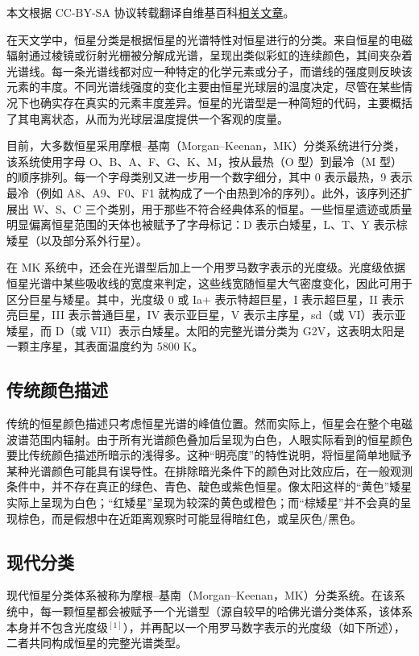 
本文根据 CC-BY-SA 协议转载翻译自维基百科\href{https://en.wikipedia.org/wiki/Stellar_classification}{相关文章}。

在天文学中，恒星分类是根据恒星的光谱特性对恒星进行的分类。来自恒星的电磁辐射通过棱镜或衍射光栅被分解成光谱，呈现出类似彩虹的连续颜色，其间夹杂着光谱线。每一条光谱线都对应一种特定的化学元素或分子，而谱线的强度则反映该元素的丰度。不同光谱线强度的变化主要由恒星光球层的温度决定，尽管在某些情况下也确实存在真实的元素丰度差异。恒星的光谱型是一种简短的代码，主要概括了其电离状态，从而为光球层温度提供一个客观的度量。

目前，大多数恒星采用摩根–基南（Morgan–Keenan，MK）分类系统进行分类，该系统使用字母 O、B、A、F、G、K、M，按从最热（O 型）到最冷（M 型）的顺序排列。每一个字母类别又进一步用一个数字细分，其中 0 表示最热，9 表示最冷（例如 A8、A9、F0、F1 就构成了一个由热到冷的序列）。此外，该序列还扩展出 W、S、C 三个类别，用于那些不符合经典体系的恒星。一些恒星遗迹或质量明显偏离恒星范围的天体也被赋予了字母标记：D 表示白矮星，L、T、Y 表示棕矮星（以及部分系外行星）。

在 MK 系统中，还会在光谱型后加上一个用罗马数字表示的光度级。光度级依据恒星光谱中某些吸收线的宽度来判定，这些线宽随恒星大气密度变化，因此可用于区分巨星与矮星。其中，光度级 0 或 Ia+ 表示特超巨星，I 表示超巨星，II 表示亮巨星，III 表示普通巨星，IV 表示亚巨星，V 表示主序星，sd（或 VI）表示亚矮星，而 D（或 VII）表示白矮星。太阳的完整光谱分类为 G2V，这表明太阳是一颗主序星，其表面温度约为 5800 K。
\subsection{传统颜色描述}
传统的恒星颜色描述只考虑恒星光谱的峰值位置。然而实际上，恒星会在整个电磁波谱范围内辐射。由于所有光谱颜色叠加后呈现为白色，人眼实际看到的恒星颜色要比传统颜色描述所暗示的浅得多。这种“明亮度”的特性说明，将恒星简单地赋予某种光谱颜色可能具有误导性。在排除暗光条件下的颜色对比效应后，在一般观测条件中，并不存在真正的绿色、青色、靛色或紫色恒星。像太阳这样的“黄色”矮星实际上呈现为白色；“红矮星”呈现为较深的黄色或橙色；而“棕矮星”并不会真的呈现棕色，而是假想中在近距离观察时可能显得暗红色，或呈灰色/黑色。
\subsection{现代分类}
现代恒星分类体系被称为摩根–基南（Morgan–Keenan，MK）分类系统。在该系统中，每一颗恒星都会被赋予一个光谱型（源自较早的哈佛光谱分类体系，该体系本身并不包含光度级$^{[1]}$），并再配以一个用罗马数字表示的光度级（如下所述），二者共同构成恒星的完整光谱类型。

